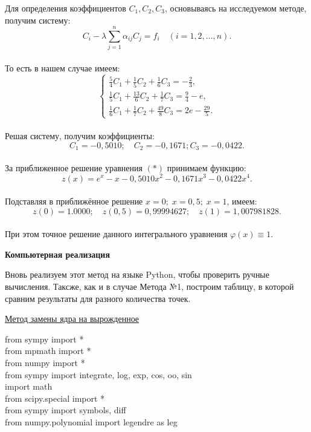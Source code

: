 \documentclass[12pt]{article}
\begin{document}
Для определения коэффициентов $ C_1, C_2, C_3 $,  основываясь на исследуемом методе, получим систему:\\
$$ C_i - \lambda\sum\limits_{j=1}^n \alpha_{ij}C_j = f_i \quad (i=1,2, ..., n).$$ \\
То есть в нашем случае имеем:\\

\begin{equation*}
\begin{cases}
\frac{5}{4}C_1 + \frac{1}{5}C_2 + \frac{1}{6}C_3 = -\frac{2}{3}, \\ 
\frac{1}{5}C_1 + \frac{13}{6}C_2 + \frac{1}{7}C_3 = \frac{9}{4} - e,\\
\frac{1}{6}C_1 + \frac{1}{7}C_2 + \frac{49}{8}C_3 = 2e -\frac{29}{5}.
\end{cases}
\end{equation*}\\
Решая систему, получим коэффициенты:\\
$$ C_1 = - 0,5010 ;  \quad  C_2 = -0,1671 ; C_3 = -0,0422 . $$\\
За приближенное решение уравнения $ (\ast) $ принимаем функцию:\\
$$ z(x) = e^x - x - 0,5010x^2 - 0,1671x^3 - 0,0422x^4 . $$\\
Подставляя в приближённое решение $ x = 0; \; x = 0,5; \; x =1 $, имеем:\\
$$ z(0) = 1. 0000 ; \quad z(0,5) = 0,99994627 ; \quad z(1) = 1,007981828 . $$\\
При этом точное решение данного интегрального уравнения $ \varphi(x) \equiv 1 . $ \\
\newpage
\begin{center}
	\textbf{Компьютерная реализация}
\end{center}

Вновь реализуем этот метод на языке Python, чтобы проверить ручные вычисления. Таксже, как и в случае Метода №1, построим таблицу, в которой сравним результаты для разного количества точек.\\

\begin{center}
	\underline{                                       Метод замены ядра на вырожденное}
\end{center}
from sympy import *\\
from mpmath import *\\
from numpy import *\\
from sympy import integrate, log, exp, cos, oo, sin\\
import math\\
from scipy.special import *\\
from sympy import symbols, diff\\
from numpy.polynomial import legendre as leg\\
\end{document}
